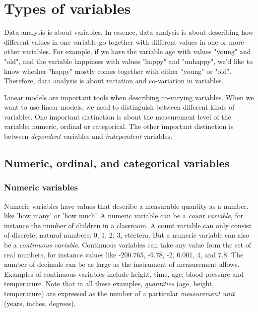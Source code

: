 \documentclass[]{report}\usepackage[]{graphicx}\usepackage[]{color}
\begin{document}
\section{Types of variables}


Data analysis is about variables. In essence, data analysis is about describing how different values in one variable go together with different values in one or more other variables. For example, if we have the variable age with values "young" and "old", and the variable happiness with values "happy" and "unhappy", we'd like to know whether "happy" mostly comes together with either "young" or "old". Therefore, data analysis is about variation and co-variation in variables. 

Linear models are important tools when describing co-varying variables. When we want to use linear models, we need to distinguish between different kinds of variables. One important distinction is about the measurement level of the variable: numeric, ordinal or categorical. The other important distinction is between \textit{dependent} variables and \textit{independent} variables.  



\subsection{Numeric, ordinal, and categorical variables}

\subsubsection{Numeric variables}

Numeric variables have values that describe a measurable quantity as a number, like 'how many' or 'how much'. A numeric variable can be a \textit{count variable}, for instance the number of children in a classroom. A count variable can only consist of discrete, natural numbers: 0, 1, 2, 3, etcetera. But a numeric variable can also be a \textit{continuous variable}. Continuous variables can take any value from the set of real numbers, for instance values like -200.765, -9.78, -2, 0.001, 4, and 7.8. The number of decimals can be as large as the instrument of measurement allows. Examples of continuous variables include height, time, age, blood pressure and temperature. Note that in all these examples, \textit{quantities} (age, height, temperature) are expressed as the number of a particular \textit{measurement unit} (years, inches, degrees). 
\end{document}
